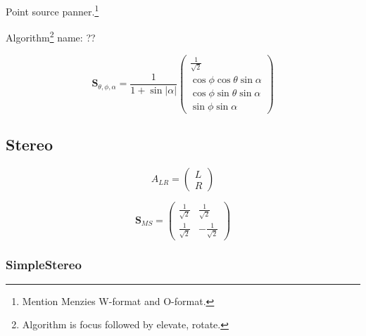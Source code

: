\documentclass[12pt]{article}
\providecommand{\abs}[1]{\lvert#1\rvert}
\begin{document}
Point source panner.\footnote{Mention Menzies W-format and O-format.}

Algorithm\footnote{Algorithm is focus followed by elevate, rotate.} name: ??

\begin{equation}	\label{eq:point_encode}
\mathbf{S}_{\theta, \phi, \alpha} = \frac{1}{1 + \sin{\abs{\alpha}}} \begin{pmatrix}
	\frac{1}{\sqrt{2}}\\
	\cos{\phi} \cos{\theta} \sin{\alpha}\\
	\cos{\phi} \sin{\theta} \sin{\alpha}\\
	\sin{\phi} \sin{\alpha}
\end{pmatrix}
\end{equation}


\subsection{Stereo}

\begin{equation}	\label{eq:stereo_sig}
A_{LR} = \begin{pmatrix}
	L\\
	R
\end{pmatrix}
\end{equation}

\begin{equation}	\label{eq:ms_matrix}
\mathbf{S}_{MS} = \begin{pmatrix}
	\frac{1}{\sqrt{2}} & \frac{1}{\sqrt{2}} \\
	\frac{1}{\sqrt{2}} & -\frac{1}{\sqrt{2}}
\end{pmatrix}
\end{equation}


\subsubsection{SimpleStereo}


\end{document}
